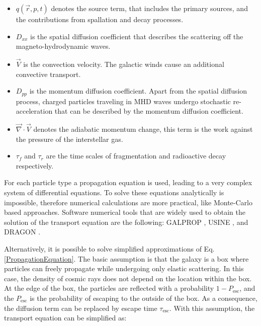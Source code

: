 \begin{itemize}
\item $q(\vec{r},p,t)$ denotes the source term, that includes the primary sources, and the contributions from spallation and decay processes.
\item $D_{xx}$ is the spatial diffusion coefficient that describes the scattering off the magneto-hydrodynamic waves.
\item $\vec{V}$ is the convection velocity. The galactic winds cause an additional convective transport.
\item $D_{pp}$ is the momentum diffusion coefficient. Apart from the spatial diffusion process, charged particles traveling in MHD waves undergo stochastic re-acceleration that can be described by the momentum diffusion coefficient.
\item $\vec{\nabla} \cdot \vec{V}$ denotes the adiabatic momentum change, this term is the work against the pressure of the interstellar gas.
\item $\tau_{f}$ and $\tau_{r}$ are the time scales of fragmentation and radioactive decay respectively.
\end{itemize}

For each particle type a propagation equation is used, leading to a very complex system of differential equations. To solve these equations analytically is impossible, therefore numerical calculations are more practical, like Monte-Carlo based approaches. Software numerical tools that are widely used to obtain the solution of the transport equation are the following: GALPROP \cite{GALPROP}, USINE \cite{USINE}, and DRAGON \cite{DRAGON}.  \par

Alternatively, it is possible to solve simplified approximations of Eq. \ref{PropagationEquation}. The basic assumption is that the galaxy is a box where particles can freely propagate while undergoing only elastic scattering. In this case, the density of cosmic rays does not depend on the location within the box. At the edge of the box, the particles are reflected with a probability $1-P_\mathrm{esc}$, and the $P_\mathrm{esc}$ is the probability of escaping to the outside of the box. As a consequence, the diffusion term can be replaced by escape time $\tau_\mathrm{esc}$. With this assumption, the transport equation can be simplified as:


